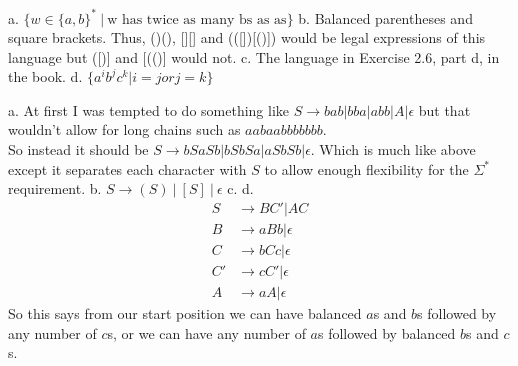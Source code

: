

\usepackage{subfigure}
\usepackage{graphicx}



\homeworkheader{\classnameandsection}

\begin{problem}{1}
  a. $\{w \in \{a,b\}^*\ |\ \text{w has twice as many bs as as} \}$
  \br
  b. Balanced parentheses and square brackets. Thus, ()(), [][] and (([])[()]) would be legal expressions of this
     language but ([)] and [(()] would not.
  \br
  c. The language in Exercise 2.6, part d, in the book.
  \br
  d. $\{ a^ib^jc^k | i = j or j = k \}$
  \begin{solution}
    a. At first I was tempted to do something like $S \rightarrow bab | bba | abb | A | \epsilon$ but that wouldn't
    allow for long chains such as $aabaabbbbbbb$. \\ So instead it should be $S \rightarrow bSaSb | bSbSa |
    aSbSb|\epsilon$. Which is much like above except it separates each character with $S$ to allow enough flexibility
    for the $\Sigma^*$ requirement.
    \br
    b. $S \rightarrow (S)\ |\ [S]\ |\ \epsilon$
    \br
    c.
    \br
    d.
    \begin{align*}
      S &\rightarrow BC'|AC \\
      B &\rightarrow aBb | \epsilon \\
      C &\rightarrow bCc | \epsilon \\
      C' &\rightarrow cC' | \epsilon \\
      A &\rightarrow aA | \epsilon
    \end{align*}
    So this says from our start position we can have balanced $a$s and $b$s followed by any number of $c$s, or we can
    have any number of $a$s followed by balanced $b$s and $c$s.
  \end{solution}
\end{problem}

